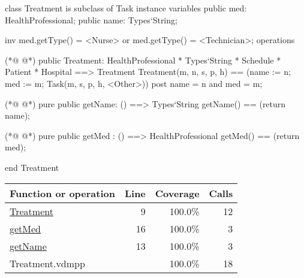 \begin{vdmpp}[breaklines=true]
class Treatment is subclass of Task
instance variables
  public med: HealthProfessional;
  public name: Types`String;
  
  inv med.getType() = <Nurse> or med.getType() = <Technician>;
operations

(*@
\label{Treatment:9}
@*)
 public Treatment: HealthProfessional * Types`String * Schedule * Patient * Hospital ==> Treatment
  Treatment(m, n, s, p, h) == (name := n; med := m; Task(m, s, p, h, <Other>))
 post name = n and med = m;
 
(*@
\label{getName:13}
@*)
 pure public getName: () ==> Types`String
  getName() == (return name);
 
(*@
\label{getMed:16}
@*)
 pure public getMed : () ==> HealthProfessional
  getMed() == (return med);

end Treatment
\end{vdmpp}
\bigskip
\begin{longtable}{|l|r|r|r|}
\hline
Function or operation & Line & Coverage & Calls \\
\hline
\hline
\hyperref[Treatment:9]{Treatment} & 9&100.0\% & 12 \\
\hline
\hyperref[getMed:16]{getMed} & 16&100.0\% & 3 \\
\hline
\hyperref[getName:13]{getName} & 13&100.0\% & 3 \\
\hline
\hline
Treatment.vdmpp & & 100.0\% & 18 \\
\hline
\end{longtable}

